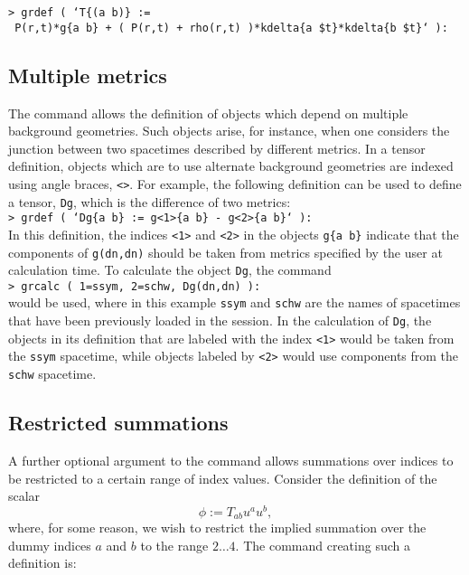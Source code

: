 \documentclass{article}
\begin{document}
\noindent\texttt{> grdef ( `T\{(a b)\} := }\\
\indent\texttt{\hspace{10mm} P(r,t)*g\{a b\}
  + ( P(r,t) + rho(r,t) )*kdelta\{a \$t\}*kdelta\{b \$t\}` ):}
%
\subsection*{Multiple metrics}
%
The  command allows the definition of objects which depend
on multiple background geometries. Such objects arise, for instance, when
one considers the junction between two spacetimes described by different
metrics. In a tensor definition, objects which are to use alternate
background geometries are indexed using angle braces, \texttt{<>}. For
example, the following definition can be used to define a tensor,
\texttt{Dg}, which is the difference of two metrics:\\

\noindent\texttt{> grdef ( `Dg\{a b\} := g<1>\{a b\} - g<2>\{a b\}` ):} \\

\noindent In this definition, the indices \texttt{<1>} and \texttt{<2>}
in the objects \texttt{g\{a b\}} indicate that the components of
\texttt{g(dn,dn)} should be taken from metrics specified by the user
at calculation time. To calculate the object \texttt{Dg}, the command\\

\noindent\texttt{> grcalc ( 1=ssym, 2=schw, Dg(dn,dn) ):}\\

\noindent would be used, where in this example \texttt{ssym} and 
\texttt{schw} are the names of spacetimes that have been
previously loaded in the session.  In the calculation of \texttt{Dg},
the objects in its definition that are labeled with the index
\texttt{<1>} would be taken from the \texttt{ssym} spacetime, while
objects labeled by \texttt{<2>} would use components from the
\texttt{schw} spacetime.
%
\subsection*{Restricted summations}\label{sec:restrictedsum}
%
A further optional argument to the  command allows
summations over indices to be restricted to a certain range of index
values.  Consider the definition of the scalar
\[
  \phi := T_{ab} u^a u^b,
\]
where, for some reason, we wish to restrict the implied summation over the
dummy indices $a$ and $b$ to the range $2\ldots 4$. The 
command creating such a definition is:\\
\end{document}
